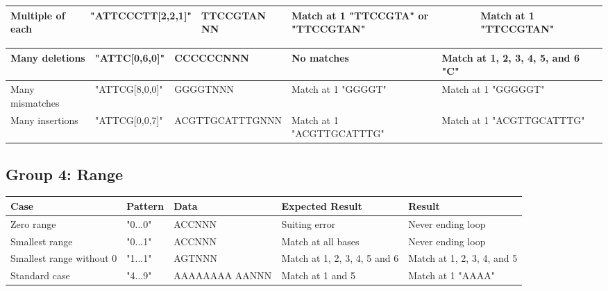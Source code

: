\documentclass[12pt]{article}
\begin{document}
\begin{appendices}
\begin{table}[H]
\begin{tabular}{p{4cm}|p{3.6cm}|p{2.5cm}|p{2.2cm}|p{2.2cm}}
\rowcolor{lightgreen}
Multiple of each		& "ATTCCCTT[2,2,1]" & TTCCGTAN NN & Match at 1 "TTCCGTA" or "TTCCGTAN" & Match at 1 "TTCCGTAN"\\ \hline
\end{tabular}
\end{table}
\begin{table}[H]
\begin{tabular}{p{4cm}|p{3.6cm}|p{2.5cm}|p{2.2cm}|p{2.2cm}}
\rowcolor{lightred}
Many deletions		& "ATTC[0,6,0]" & CCCCCCNNN & No matches & Match at 1, 2, 3, 4, 5, and 6 "C" \\ \hline
\rowcolor{lightgreen}
Many mismatches		& "ATTCG[8,0,0]" & GGGGTNNN & Match at 1 "GGGGT" & Match at 1 "GGGGGT" \\ \hline
\rowcolor{lightgreen}
Many insertions		& "ATTCG[0,0,7]" & ACGTTGCATTTGNNN & Match at 1 "ACGTTGCATTTG" & Match at 1 "ACGTTGCATTTG" \\ \hline
\end{tabular}
\end{table}
\subsection{Group 4: Range}
\begin{table}[H]
\begin{tabular}{p{4cm}|p{3cm}|p{2.5cm}|p{2.5cm}|p{2.5cm}}
Case 			& Pattern & Data & Expected Result & Result \\ \hline
\rowcolor{lightred}
Zero range	& "0...0" & ACCNNN & Suiting error & Never ending loop \\ \hline
\rowcolor{lightred}
Smallest range 	& "0...1" & ACCNNN & Match at all bases & Never ending loop \\ \hline
\rowcolor{lightgreen}
Smallest range without 0 & "1...1" & AGTNNN & Match at 1, 2, 3, 4, 5 and 6 & Match at 1, 2, 3, 4, and 5 \\ \hline
\rowcolor{lightgreen}
Standard case	& "4...9" & AAAAAAAA AANNN & Match at 1 and 5 & Match at 1 "AAAA" \\ \hline
\end{tabular}
\end{table} 

\end{appendices}
\end{document}
